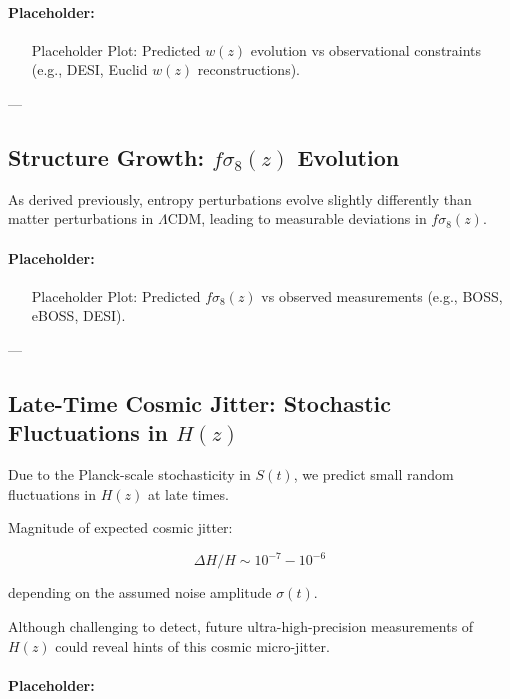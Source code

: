 \documentclass{article}
\begin{document}
\paragraph{Placeholder:}

\begin{itemize}
    \item [Placeholder] Plot: Predicted $w(z)$ evolution vs observational constraints (e.g., DESI, Euclid $w(z)$ reconstructions).
\end{itemize}

---

\subsection{Structure Growth: $f\sigma_8(z)$ Evolution}

As derived previously, entropy perturbations evolve slightly differently than matter perturbations in $\Lambda$CDM, leading to measurable deviations in $f\sigma_8(z)$.

\paragraph{Placeholder:}

\begin{itemize}
    \item [Placeholder] Plot: Predicted $f\sigma_8(z)$ vs observed measurements (e.g., BOSS, eBOSS, DESI).
\end{itemize}

---

\subsection{Late-Time Cosmic Jitter: Stochastic Fluctuations in $H(z)$}

Due to the Planck-scale stochasticity in $S(t)$, we predict small random fluctuations in $H(z)$ at late times.

Magnitude of expected cosmic jitter:

\[
\Delta H/H \sim 10^{-7} - 10^{-6}
\]

depending on the assumed noise amplitude $\sigma(t)$.

Although challenging to detect, future ultra-high-precision measurements of $H(z)$ could reveal hints of this cosmic micro-jitter.

\paragraph{Placeholder:}
\end{document}
